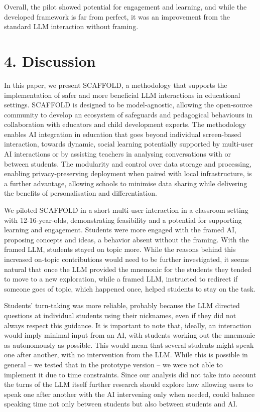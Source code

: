 \documentclass[fleqn,10pt]{wlscirep}
\begin{document}
Overall, the pilot showed potential for engagement and learning, and while the developed framework is far from perfect, it was an improvement from the standard LLM interaction without framing.

\section*{4. Discussion}

In this paper, we present SCAFFOLD, a methodology that supports the implementation of safer and more beneficial LLM interactions in educational settings. SCAFFOLD is designed to be model-agnostic, allowing the open-source community to develop an ecosystem of safeguards and pedagogical behaviours in collaboration with educators and child development experts. The methodology enables AI integration in education that goes beyond individual screen-based interaction, towards dynamic, social learning potentially supported by multi-user AI interactions or by assisting teachers in analysing conversations with or between students. The modularity and control over data storage and processing, enabling privacy-preserving deployment when paired with local infrastructure, is a further advantage, allowing schools to minimise data sharing while delivering the benefits of personalisation and differentiation.

We piloted SCAFFOLD in a short multi-user interaction in a classroom setting with 12-16-year-olds, demonstrating feasibility and a potential for supporting learning and engagement. Students were more engaged with the framed AI, proposing concepts and ideas, a behavior absent without the framing. With the framed LLM, students stayed on topic more. While the reasons behind this increased on-topic contributions would need to be further investigated, it seems natural that once the LLM provided the mnemonic for the students they tended to move to a new exploration, while a framed LLM, instructed to redirect if someone goes of topic, which happened once, helped students to stay on the task.

Students' turn-taking was more reliable, probably because the LLM directed questions at individual students using their nicknames, even if they did not always respect this guidance. It is important to note that, ideally, an interaction would imply minimal input from an AI, with students working out the mnemonic as autonomously as possible. This would mean that several students might speak one after another, with no intervention from the LLM. While this is possible in general -- we tested that in the prototype version -- we were not able to implement it due to time constraints. Since our analysis did not take into account the turns of the LLM itself further research should explore how allowing users to speak one after another with the AI intervening only when needed, could balance speaking time not only between students but also between students and AI.
\end{document}
